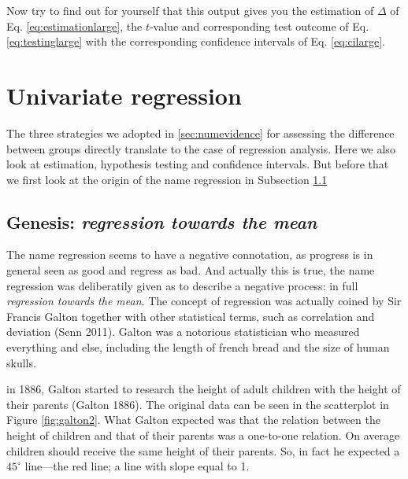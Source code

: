 \documentclass[
]{book}
\begin{document}
Now try to find out for yourself that this output gives you the estimation of \(\Delta\) of Eq. \eqref{eq:estimationlarge}, the \(t\)-value and corresponding test outcome of Eq. \eqref{eq:testinglarge} with the corresponding confidence intervals of Eq. \eqref{eq:cilarge}.

\hypertarget{sec:uniregress}{%
\section{Univariate regression}\label{sec:uniregress}}

The three strategies we adopted in \ref{sec:numevidence} for assessing the difference between groups directly translate to the case of regression analysis. Here we also look at estimation, hypothesis testing and confidence intervals. But before that we first look at the origin of the name regression in Subsection \ref{sec:genesis}

\hypertarget{sec:genesis}{%
\subsection{\texorpdfstring{Genesis: \emph{regression towards the mean}}{Genesis: regression towards the mean}}\label{sec:genesis}}

The name regression seems to have a negative connotation, as progress is in general seen as good and regress as bad. And actually this is true, the name regression was deliberatily given as to describe a negative process: in full \emph{regression towards the mean}. The concept of regression was actually coined by Sir Francis Galton together with other statistical terms, such as correlation and deviation (Senn 2011). Galton was a notorious statistician who measured everything and else, including the length of french bread and the size of human skulls.

in 1886, Galton started to research the height of adult children with the height of their parents (Galton 1886). The original data can be seen in the scatterplot in Figure \ref{fig:galton2}. What Galton expected was that the relation between the height of children and that of their parents was a one-to-one relation. On average children should receive the same height of their parents. So, in fact he expected a \(45^{\circ}\) line---the red line; a line with slope equal to 1.
\end{document}
